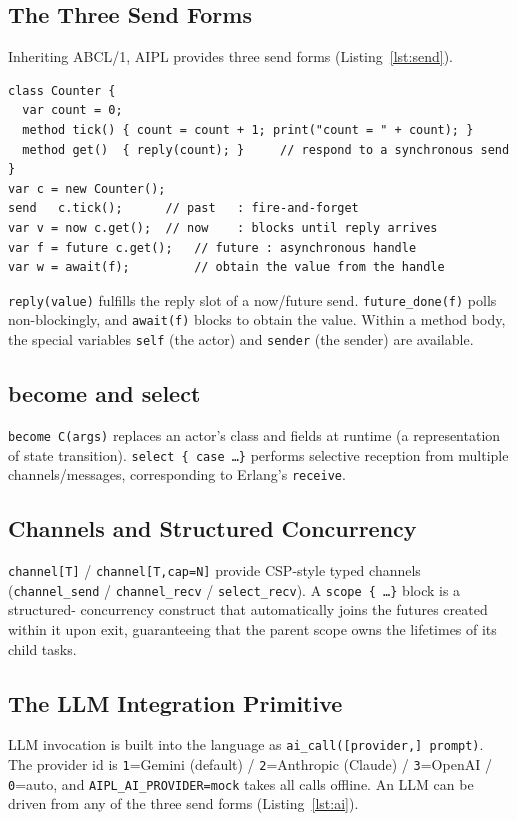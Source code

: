 \documentclass[11pt,a4paper]{article}
\newcommand{\code}[1]{\texttt{\small #1}}
\begin{document}
\subsection{The Three Send Forms}
Inheriting ABCL/1, AIPL provides three send forms
(Listing~\ref{lst:send}).

\begin{lstlisting}[caption={Three send forms and reply},label={lst:send},float=h]
class Counter {
  var count = 0;
  method tick() { count = count + 1; print("count = " + count); }
  method get()  { reply(count); }     // respond to a synchronous send
}
var c = new Counter();
send   c.tick();      // past   : fire-and-forget
var v = now c.get();  // now    : blocks until reply arrives
var f = future c.get();   // future : asynchronous handle
var w = await(f);         // obtain the value from the handle
\end{lstlisting}

\code{reply(value)} fulfills the reply slot of a now/future send.
\code{future\_done(f)} polls non-blockingly, and \code{await(f)} blocks
to obtain the value. Within a method body, the special variables
\code{self} (the actor) and \code{sender} (the sender) are available.

\subsection{become and select}
\code{become C(args)} replaces an actor's class and fields at runtime
(a representation of state transition). \code{select \{ case \dots \}}
performs selective reception from multiple channels/messages,
corresponding to Erlang's \code{receive}.

\subsection{Channels and Structured Concurrency}
\code{channel[T]} / \code{channel[T,cap=N]} provide CSP-style typed
channels (\code{channel\_send} / \code{channel\_recv} /
\code{select\_recv}). A \code{scope \{ \dots \}} block is a structured-
concurrency construct that automatically joins the futures created
within it upon exit, guaranteeing that the parent scope owns the
lifetimes of its child tasks.

\subsection{The LLM Integration Primitive}
LLM invocation is built into the language as
\code{ai\_call([provider,] prompt)}. The provider id is
\code{1}=Gemini (default) / \code{2}=Anthropic (Claude) /
\code{3}=OpenAI / \code{0}=auto, and \code{AIPL\_AI\_PROVIDER=mock}
takes all calls offline. An LLM can be driven from any of the three send
forms (Listing~\ref{lst:ai}).
\end{document}
